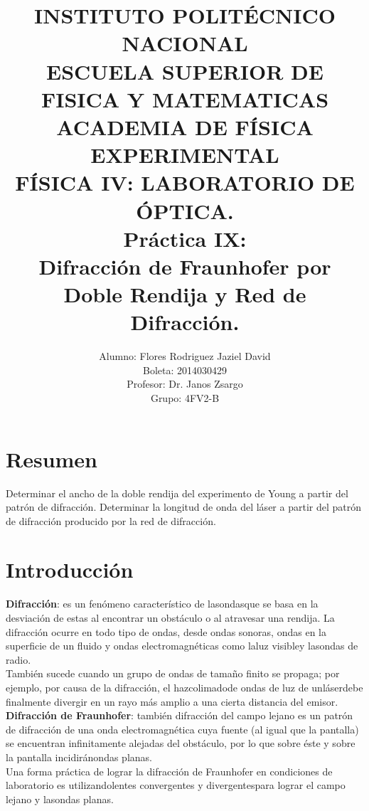 \documentclass[13,twocolumn,letterpaper]{article}
\title{
    		\usefont{OT1}{bch}{b}{n}
    		\normalfont \normalsize \textsc{INSTITUTO POLITÉCNICO NACIONAL \\ 
    		ESCUELA SUPERIOR DE FISICA Y MATEMATICAS \\
    		ACADEMIA DE FÍSICA EXPERIMENTAL} \\ 
    		FÍSICA IV: LABORATORIO DE ÓPTICA. \\[10pt]
    		\huge Práctica IX:\\
  Difracción de Fraunhofer por Doble Rendija y Red de Difracción.\\
    }
\author[0]{Alumno: Flores Rodriguez Jaziel David \\
    Boleta: 2014030429 \\
    Profesor: Dr. Janos Zsargo\\
    Grupo: 4FV2-B \\
            }
\begin{document}
    
    \maketitle
   
    
    \section*{Resumen}
Determinar el ancho de la doble rendija del experimento de Young a partir del patrón de  difracción. Determinar  la  longitud  de  onda  del  láser  a  partir  del  patrón  de difracción producido por la red de difracción.\\ 

\section*{Introducción}

\textbf{Difracción}: es  un  fenómeno  característico  de  lasondasque  se  basa  en  la desviación  de  estas  al  encontrar  un  obstáculo  o  al  atravesar  una  rendija.  La difracción  ocurre  en  todo  tipo  de  ondas,  desde  ondas sonoras,  ondas  en  la superficie de un fluido y ondas electromagnéticas como laluz visibley lasondas de radio.\\

También sucede cuando un grupo de ondas de tamaño finito se propaga; por ejemplo,   por   causa   de   la   difracción,   el   hazcolimadode   ondas   de   luz   de unláserdebe finalmente divergir en un rayo más amplio a una cierta distancia del emisor. \\

\textbf{Difracción  de  Fraunhofer}: también difracción  del  campo  lejano es  un  patrón  de difracción de  una  onda electromagnética  cuya  fuente  (al  igual  que  la pantalla)  se encuentran  infinitamente  alejadas del  obstáculo,  por  lo que  sobre  éste  y  sobre  la pantalla incidiránondas planas.\\

Una  forma  práctica  de  lograr  la  difracción  de Fraunhofer  en  condiciones  de laboratorio  es  utilizandolentes  convergentes  y  divergentespara  lograr  el  campo lejano y lasondas planas.
\end{document}
